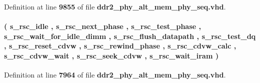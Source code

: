 Definition at line {\bf 9855} of file {\bf ddr2\+\_\+phy\+\_\+alt\+\_\+mem\+\_\+phy\+\_\+seq.\+vhd}.

\paragraph[{t\+\_\+resync\+\_\+state}]{ {\bfseries \textcolor{vhdlchar}{(}\textcolor{vhdlchar}{ }\textcolor{vhdlchar}{s\+\_\+rsc\+\_\+idle}\textcolor{vhdlchar}{ }\textcolor{vhdlchar}{,}\textcolor{vhdlchar}{ }\textcolor{vhdlchar}{s\+\_\+rsc\+\_\+next\+\_\+phase}\textcolor{vhdlchar}{ }\textcolor{vhdlchar}{,}\textcolor{vhdlchar}{ }\textcolor{vhdlchar}{s\+\_\+rsc\+\_\+test\+\_\+phase}\textcolor{vhdlchar}{ }\textcolor{vhdlchar}{,}\textcolor{vhdlchar}{ }\textcolor{vhdlchar}{s\+\_\+rsc\+\_\+wait\+\_\+for\+\_\+idle\+\_\+dimm}\textcolor{vhdlchar}{ }\textcolor{vhdlchar}{,}\textcolor{vhdlchar}{ }\textcolor{vhdlchar}{s\+\_\+rsc\+\_\+flush\+\_\+datapath}\textcolor{vhdlchar}{ }\textcolor{vhdlchar}{,}\textcolor{vhdlchar}{ }\textcolor{vhdlchar}{s\+\_\+rsc\+\_\+test\+\_\+dq}\textcolor{vhdlchar}{ }\textcolor{vhdlchar}{,}\textcolor{vhdlchar}{ }\textcolor{vhdlchar}{s\+\_\+rsc\+\_\+reset\+\_\+cdvw}\textcolor{vhdlchar}{ }\textcolor{vhdlchar}{,}\textcolor{vhdlchar}{ }\textcolor{vhdlchar}{s\+\_\+rsc\+\_\+rewind\+\_\+phase}\textcolor{vhdlchar}{ }\textcolor{vhdlchar}{,}\textcolor{vhdlchar}{ }\textcolor{vhdlchar}{s\+\_\+rsc\+\_\+cdvw\+\_\+calc}\textcolor{vhdlchar}{ }\textcolor{vhdlchar}{,}\textcolor{vhdlchar}{ }\textcolor{vhdlchar}{s\+\_\+rsc\+\_\+cdvw\+\_\+wait}\textcolor{vhdlchar}{ }\textcolor{vhdlchar}{,}\textcolor{vhdlchar}{ }\textcolor{vhdlchar}{s\+\_\+rsc\+\_\+seek\+\_\+cdvw}\textcolor{vhdlchar}{ }\textcolor{vhdlchar}{,}\textcolor{vhdlchar}{ }\textcolor{vhdlchar}{s\+\_\+rsc\+\_\+wait\+\_\+iram}\textcolor{vhdlchar}{ }\textcolor{vhdlchar}{)}\textcolor{vhdlchar}{ }} \hspace{0.3cm}{\ttfamily [Type]}}\label{classddr2__phy__alt__mem__phy__dgrb_1_1struct_a2a2d53c9b118c0937b2c7de9c91ac839}


Definition at line {\bf 7964} of file {\bf ddr2\+\_\+phy\+\_\+alt\+\_\+mem\+\_\+phy\+\_\+seq.\+vhd}.

